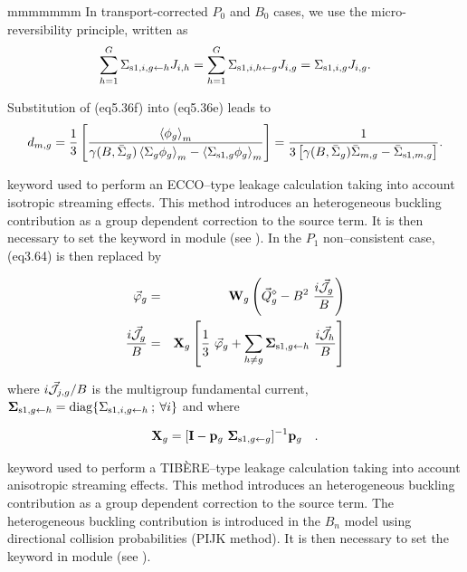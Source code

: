 \begin{ListeDeDescription}{mmmmmmm}
In transport-corrected $P_0$ and $B_0$ cases, we use the micro-reversibility principle, written as
\begin{equation}
\sum_{h=1}^G \Sigma_{{\rm s1},i,g \leftarrow h} J_{i,h} =\sum_{h=1}^G \Sigma_{{\rm s1},i,h \leftarrow g} J_{i,g}=\Sigma_{{\rm s1},i,g} J_{i,g} .
\label{eq:eq5.36f}
\end{equation}

Substitution of \eq(eq5.36f) into \eq(eq5.36e) leads to
\begin{equation}
d_{m,g} = {1\over 3}\left[ {\left<\phi_g\right>_m\over \gamma(B,\bar\Sigma_g)\left<\Sigma_g\phi_g\right>_m-\left<\Sigma_{{\rm s1},g}\phi_g\right>_m}\right]=
{1\over 3\left[\gamma(B,\bar\Sigma_g)\bar\Sigma_{m,g}-\bar\Sigma_{{\rm s1},m,g}\right]} .
\label{eq:eq5.36c}
\end{equation}

\item[\moc{ECCO}] keyword used to perform an ECCO--type leakage
calculation taking into account isotropic streaming effects. This method
introduces an heterogeneous buckling contribution as a group dependent correction
to the source term.\cite{ecco,rimpault} It is then necessary to set the keyword 
in module  (see ). In the $P_1$ non--consistent case,
\eq(eq3.64) is then replaced by

\vskip -0.3cm

\begin{eqnarray}
\vec\varphi_g&=& {\bf W}_g \left(\vec Q^\diamond_g - B^2 \ {i\vec{\cal J}_g\over B}\right)
\label{eq:eq5.37flux} \\
{i\vec{\cal J}_g\over B} &=& {\bf X}_g \left[{1 \over 3}
\ \vec\varphi_g + \sum_{h\not= g} {\bf \Sigma}_{{\rm s1},g \gets h} \
{i\vec{\cal J}_h\over B} \right]
\label{eq:eq5.37cour}
\end{eqnarray}

\noindent where $i\vec{\cal J}_{j,g}/B$ is the multigroup fundamental current, ${\bf \Sigma}_{{\rm s1},g \gets h}={\rm diag}\{ \Sigma_{{\rm s1},i,g \gets h}\> ;\> \forall i \}$ and where

\begin{equation}
{\bf X}_g=[{\bf I}-{\bf p}_g \ {\bf\Sigma}_{{\rm s}1,g\gets g}]^{-1} {\bf p}_g \ \ \ .
\label{eq:eq5.37ter}
\end{equation}

\item[\moc{TIBERE}] keyword used to perform a TIB\`ERE--type leakage
calculation taking into account anisotropic streaming effects. This method
introduces an heterogeneous buckling contribution as a group dependent correction
to the source term.\cite{PIJK0,PIJK} The heterogeneous buckling contribution is
introduced in the $B_n$ model using directional collision probabilities (PIJK method).
It is then necessary to set the keyword
 in module  (see ).


\end{ListeDeDescription}
